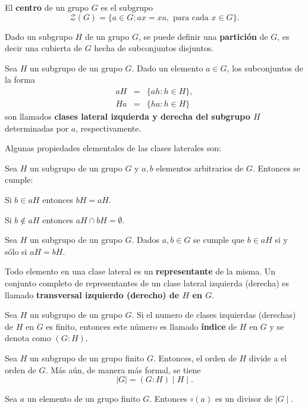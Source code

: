  \begin{definicion}
 El \textbf{centro} de un grupo $G$ es el subgrupo \[ \mathcal{Z}(G) = \{ a \in G \colon ax=xa, \mbox{ para cada }  x \in G \}. \]
\end{definicion}
Dado un subgrupo $H$ de un grupo $G$, se puede definir una \textbf{partición} de $G$, es decir una cubierta de $G$ hecha de subconjuntos disjuntos. 
\begin{definicion}
Sea $H$ un subgrupo de un grupo $G$. Dado un elemento $a \in G$, los subconjuntos de la forma 
\begin{eqnarray*}
aH &=& \{ ah \colon h \in H \}, \\
Ha &=& \{ ha \colon h \in H \} 
\end{eqnarray*}
son llamados \textbf{ clases lateral izquierda y derecha del subgrupo $H$} determinadas por $a$, respectivamente.
\end{definicion}
Algunas propiedades elementales de las clases laterales son:
\begin{proposicion}
Sea $H$ un subgrupo de un grupo $G$ y $a,b$ elementos arbitrarios de $G$. Entonces se cumple:
\begin{bulletList}
\item Si $b \in aH$ entonces $bH = aH$.
\item Si $b \notin aH$ entonces $aH \cap bH = \emptyset$.
\end{bulletList}
\end{proposicion}
\begin{corolario}
Sea $H$ un subgrupo de un grupo $G$. Dados $a,b \in G$ se cumple que $b \in aH$ si y sólo si $aH = bH$.
\end{corolario}
Todo elemento en una clase lateral es un \textbf{representante} de la misma. Un conjunto completo de representantes de un clase lateral izquierda (derecha) es llamado \textbf{transversal izquierdo (derecho) de $H$ en $G$}.
\begin{definicion}
Sea $H$ un subgrupo de un grupo $G$. Si el numero de clases izquierdas (derechas) de $H$ en $G$ es finito, entonces este número es llamado  \textbf{índice} de $H$ en $G$ y se denota como $(G:H)$.
\end{definicion}
\begin{teorema}[Lagrange]
Sea $H$ un subgrupo de un grupo finito $G$. Entonces, el orden de $H$ divide a el orden de $G$. Más aún, de manera más formal, se tiene
\[ \mid G \mid = (G:H) \mid H \mid. \]
\end{teorema}
\begin{corolario}
Sea $a$ un elemento de un grupo finito $G$. Entonces $\circ(a)$ es un divisor de $\mid G \mid$.
\end{corolario}
